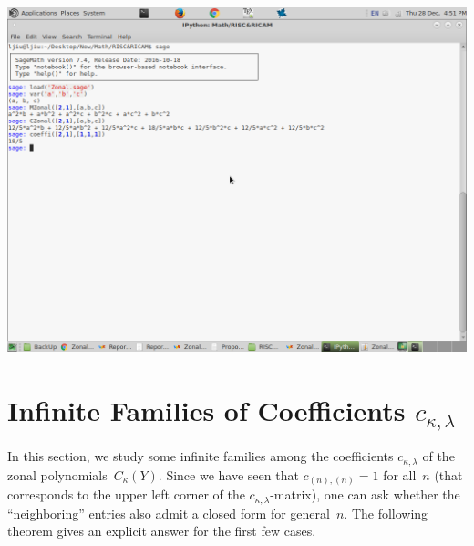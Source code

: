 \documentclass[10pt,oneside,american]{amsart}
\numberwithin{equation}{section}
\numberwithin{figure}{section}
\theoremstyle{definition}
\theoremstyle{remark}
\theoremstyle{plain}
\theoremstyle{definition}
\theoremstyle{plain}
\begin{document}
\includegraphics[scale=0.3]{ScreenShot}


\section{Infinite Families of Coefficients $c_{\kappa,\lambda}$}

In this section, we study some infinite families among the coefficients
$c_{\kappa,\lambda}$ of the zonal polynomials~$C_{\kappa}(Y)$. Since we have
seen that $c_{(n),(n)}=1$ for all~$n$ (that corresponds to the upper left
corner of the $c_{\kappa,\lambda}$-matrix), one can ask whether the
``neighboring'' entries also admit a closed form for general~$n$.  The
following theorem gives an explicit answer for the first few cases.
\end{document}

